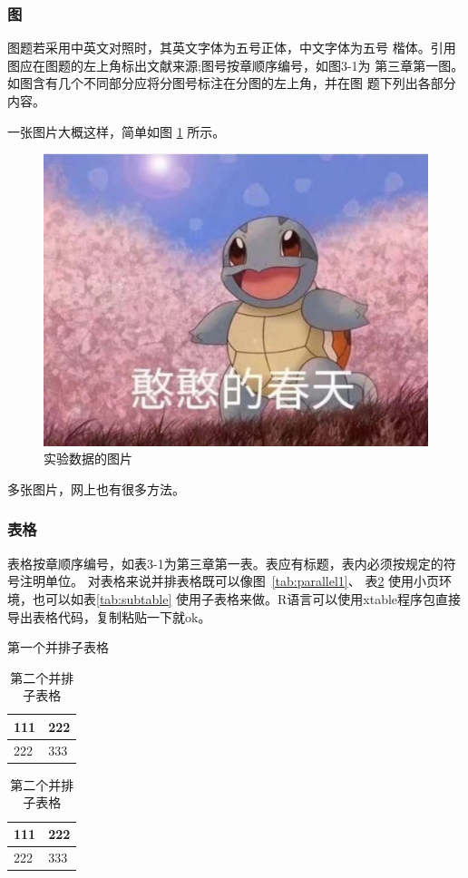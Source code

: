 \documentclass{THUThesis}
\begin{document}
\subsubsection{图}
图题若采用中英文对照时，其英文字体为五号正体，中文字体为五号 楷体。引用图应在图题的左上角标出文献来源;图号按章顺序编号，如图3-1为 第三章第一图。如图含有几个不同部分应将分图号标注在分图的左上角，并在图 题下列出各部分内容。\par
一张图片大概这样，简单如图 \ref{fig:hanhan} 所示。
\begin{figure}[!ht]
  \centering
  \includegraphics[width=0.45\linewidth]{图片1.jpg}
  \caption{实验数据的图片}
  \label{fig:hanhan}
\end{figure} 
多张图片，网上也有很多方法。
\subsubsection{表格}
表格按章顺序编号，如表3-1为第三章第一表。表应有标题，表内必须按规定的符号注明单位。
对表格来说并排表格既可以像图~\ref{tab:parallel1}、
表\ref{tab:parallel2} 使用小页环境，也可以如表\ref{tab:subtable} 使用子表格来做。R语言可以使用xtable程序包直接导出表格代码，复制粘贴一下就ok。

\begin{table}[htbp]
\noindent\begin{minipage}{0.5\textwidth}
\centering
\caption{第一个并排子表格}
\label{tab:parallel1}
\begin{tabular}{p{2cm}p{2cm}}
\toprule
111 & 222 \\\midrule
222 & 333 \\\bottomrule
\end{tabular}
\end{minipage}%
\begin{minipage}{0.5\textwidth}
\centering
\caption{第二个并排子表格}
\label{tab:parallel2}
\begin{tabular}{p{2cm}p{2cm}}
\toprule
111 & 222 \\\midrule
222 & 333 \\\bottomrule
\end{tabular}
\end{minipage}
\end{table}
\end{document}
